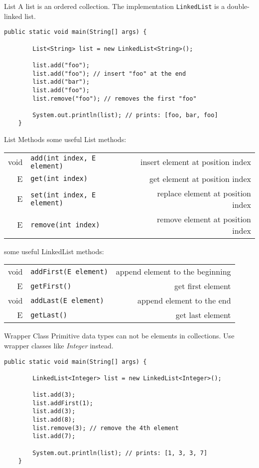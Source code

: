 \begin{frame}[fragile]{List}
	A list is an ordered collection.
	\vfill
	The implementation \texttt{LinkedList} is a double-linked list.
	\begin{lstlisting}[basicstyle=\ttfamily\scriptsize]
	public static void main(String[] args) {
	
	    List<String> list = new LinkedList<String>();
	    
	    list.add("foo"); 
	    list.add("foo"); // insert "foo" at the end
	    list.add("bar");
	    list.add("foo");
	    list.remove("foo"); // removes the first "foo"
	    
	    System.out.println(list); // prints: [foo, bar, foo]
	}
	\end{lstlisting}
\end{frame}
	
\begin{frame}[fragile]{List Methods}
	some useful List methods:\\
	\vspace{1em}
	\begin{tabular}{ r l r }
		void & \texttt{add(int index, E element)}
		& \footnotesize{insert element at position index} \\
		E &\texttt{get(int index)}
		& \footnotesize{get element at position index} \\
		E &\texttt{set(int index, E element)}
		& \footnotesize{replace element at position index} \\
		E &\texttt{remove(int index)}
		& \footnotesize{remove element at position index}
	\end{tabular}
	\vfill
	some useful LinkedList methods:\\
	\vspace{1em}
	\begin{tabular}{ r l r }
		void & \texttt{addFirst(E element)}
		& \footnotesize{append element to the beginning} \\
		E & \texttt{getFirst()}
		& \footnotesize{get first element} \\
		void & \texttt{addLast(E element)}
		& \footnotesize{append element to the end} \\
		E & \texttt{getLast()}
		& \footnotesize{get last element}
	\end{tabular}
\end{frame}

\begin{frame}[fragile]{Wrapper Class}
	Primitive data types can not be elements in collections. 
	Use wrapper classes like \emph{Integer} instead.
	\begin{lstlisting}[basicstyle=\ttfamily\scriptsize]
	public static void main(String[] args) {
	
	    LinkedList<Integer> list = new LinkedList<Integer>();
	    
	    list.add(3); 
	    list.addFirst(1);
	    list.add(3);
	    list.add(8);
	    list.remove(3); // remove the 4th element
	    list.add(7);
	    
	    System.out.println(list); // prints: [1, 3, 3, 7]
	}
	\end{lstlisting}
\end{frame}

